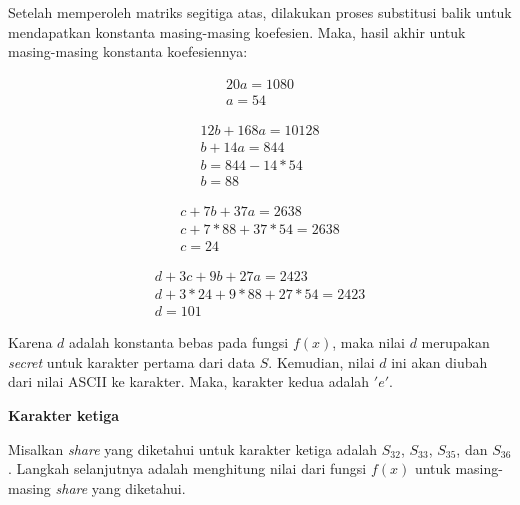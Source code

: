 Setelah memperoleh matriks segitiga atas, dilakukan proses substitusi balik untuk mendapatkan konstanta masing-masing koefesien. Maka, hasil akhir untuk masing-masing konstanta koefesiennya:

\begin{gather*}
	20a = 1080 \\
	a = 54
\end{gather*}

\begin{gather*}
	12b + 168a = 10128 \\
	b + 14a = 844 \\
	b = 844 - 14*54 \\
	b = 88
\end{gather*}

\begin{gather*}
	c + 7b + 37a = 2638 \\
	c + 7*88 + 37*54 = 2638 \\
	c = 24
\end{gather*}

\begin{gather*}
	d + 3c + 9b + 27a = 2423 \\
	d + 3*24 + 9*88 + 27*54 = 2423 \\
	d = 101
\end{gather*}

Karena \begin{math}d\end{math} adalah konstanta bebas pada fungsi \begin{math}f(x)\end{math}, maka nilai \begin{math}d\end{math} merupakan \textit{secret} untuk karakter pertama dari data \begin{math}S\end{math}. Kemudian, nilai \begin{math}d\end{math} ini akan diubah dari nilai ASCII ke karakter. Maka, karakter kedua adalah \begin{math}'e'\end{math}.

\begin{flushleft}
	\textbf{Karakter ketiga}
\end{flushleft}

Misalkan \textit{share} yang diketahui untuk karakter ketiga adalah \begin{math}S_{32}\end{math}, \begin{math}S_{33}\end{math}, \begin{math}S_{35}\end{math}, dan \begin{math}S_{36}\end{math}. Langkah selanjutnya adalah menghitung nilai dari fungsi \begin{math}f(x)\end{math} untuk masing-masing \textit{share} yang diketahui.

